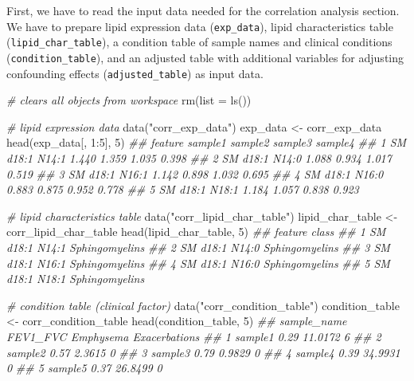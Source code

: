 \documentclass[]{article}
\newcommand{\hlnum}[1]{\textcolor[rgb]{0.816,0.125,0.439}{#1}}%
\newcommand{\hlstr}[1]{\textcolor[rgb]{0.251,0.627,0.251}{#1}}%
\newcommand{\hlcom}[1]{\textcolor[rgb]{0.502,0.502,0.502}{\textit{#1}}}%
\newcommand{\hlopt}[1]{\textcolor[rgb]{0,0,0}{#1}}%
\newcommand{\hlstd}[1]{\textcolor[rgb]{0.251,0.251,0.251}{#1}}%
\newcommand{\hlkwc}[1]{\textcolor[rgb]{0.251,0.251,0.251}{#1}}%
\newcommand{\hlkwd}[1]{\textcolor[rgb]{0.878,0.439,0.125}{#1}}%
\newenvironment{Shaded}{\begin{myshaded}}{\end{myshaded}}
\newcommand{\KeywordTok}[1]{\hlkwd{#1}}
\newcommand{\DataTypeTok}[1]{\hlkwc{#1}}
\newcommand{\DecValTok}[1]{\hlnum{#1}}
\newcommand{\StringTok}[1]{\hlstr{#1}}
\newcommand{\CommentTok}[1]{\hlcom{#1}}
\newcommand{\OperatorTok}[1]{\hlopt{#1}}
\newcommand{\NormalTok}[1]{\hlstd{#1}}
\begin{document}
First, we have to read the input data needed for the correlation analysis section. We have to prepare lipid expression data (\texttt{exp\_data}), lipid characteristics table (\texttt{lipid\_char\_table}), a condition table of sample names and clinical conditions (\texttt{condition\_table}), and an adjusted table with additional variables for adjusting confounding effects (\texttt{adjusted\_table}) as input data.

\begin{Shaded}
\begin{Highlighting}[]
\CommentTok{# clears all objects from workspace}
\KeywordTok{rm}\NormalTok{(}\DataTypeTok{list =} \KeywordTok{ls}\NormalTok{())}

\CommentTok{# lipid expression data}
\KeywordTok{data}\NormalTok{(}\StringTok{"corr_exp_data"}\NormalTok{)}
\NormalTok{exp_data <-}\StringTok{ }\NormalTok{corr_exp_data}
\KeywordTok{head}\NormalTok{(exp_data[, }\DecValTok{1}\OperatorTok{:}\DecValTok{5}\NormalTok{], }\DecValTok{5}\NormalTok{)}
\CommentTok{##          feature sample1 sample2 sample3 sample4}
\CommentTok{## 1 SM d18:1 N14:1   1.440   1.359   1.035   0.398}
\CommentTok{## 2 SM d18:1 N14:0   1.088   0.934   1.017   0.519}
\CommentTok{## 3 SM d18:1 N16:1   1.142   0.898   1.032   0.695}
\CommentTok{## 4 SM d18:1 N16:0   0.883   0.875   0.952   0.778}
\CommentTok{## 5 SM d18:1 N18:1   1.184   1.057   0.838   0.923}

\CommentTok{# lipid characteristics table}
\KeywordTok{data}\NormalTok{(}\StringTok{"corr_lipid_char_table"}\NormalTok{)}
\NormalTok{lipid_char_table <-}\StringTok{ }\NormalTok{corr_lipid_char_table}
\KeywordTok{head}\NormalTok{(lipid_char_table, }\DecValTok{5}\NormalTok{)}
\CommentTok{##          feature          class}
\CommentTok{## 1 SM d18:1 N14:1 Sphingomyelins}
\CommentTok{## 2 SM d18:1 N14:0 Sphingomyelins}
\CommentTok{## 3 SM d18:1 N16:1 Sphingomyelins}
\CommentTok{## 4 SM d18:1 N16:0 Sphingomyelins}
\CommentTok{## 5 SM d18:1 N18:1 Sphingomyelins}

\CommentTok{# condition table (clinical factor)}
\KeywordTok{data}\NormalTok{(}\StringTok{"corr_condition_table"}\NormalTok{)}
\NormalTok{condition_table <-}\StringTok{ }\NormalTok{corr_condition_table}
\KeywordTok{head}\NormalTok{(condition_table,  }\DecValTok{5}\NormalTok{)}
\CommentTok{##   sample_name FEV1_FVC Emphysema Exacerbations}
\CommentTok{## 1     sample1     0.29   11.0172             6}
\CommentTok{## 2     sample2     0.57    2.3615             0}
\CommentTok{## 3     sample3     0.79    0.9829             0}
\CommentTok{## 4     sample4     0.39   34.9931             0}
\CommentTok{## 5     sample5     0.37   26.8499             0}


\end{Highlighting}
\end{Shaded}
\end{document}
